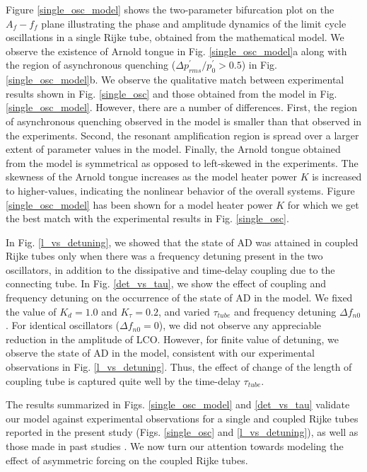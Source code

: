 \documentclass[%
preprint,
 amsmath,amssymb,
 aps,
 pra,
]{revtex4-2}
\begin{document}
Figure \ref{single_osc_model} shows the two-parameter bifurcation plot on the $A_f-f_f$ plane illustrating the phase and amplitude dynamics of the limit cycle oscillations in a single Rijke tube, obtained from the mathematical model. We observe the existence of Arnold tongue in Fig. \ref{single_osc_model}a along with the region of asynchronous quenching ($\Delta p^\prime_{rms}/p^\prime_{0}>0.5$) in Fig. \ref{single_osc_model}b. We observe the qualitative match between experimental results shown in Fig. \ref{single_osc} and those obtained from the model in Fig. \ref{single_osc_model}. However, there are a number of differences. First, the region of asynchronous quenching observed in the model is smaller than that observed in the experiments. Second, the resonant amplification region is spread over a larger extent of parameter values in the model. Finally, the Arnold tongue obtained from the model is symmetrical as opposed to left-skewed in the experiments. The skewness of the Arnold tongue increases as the model heater power $K$ is increased to higher-values, indicating the nonlinear behavior of the overall systems. Figure \ref{single_osc_model} has been shown for a model heater power $K$ for which we get the best match with the experimental results in Fig. \ref{single_osc}.

In Fig. \ref{l_vs_detuning}, we showed that the state of AD was attained in coupled Rijke tubes only when there was a frequency detuning present in the two oscillators, in addition to the dissipative and time-delay coupling due to the connecting tube. In Fig. \ref{det_vs_tau}, we show the effect of coupling and frequency detuning on the occurrence of the state of AD in the model. We fixed the value of $K_d=1.0$ and $K_\tau=0.2$, and varied $\tau_{tube}$ and frequency detuning $\Delta f_{n0}$. For identical oscillators ($\Delta f_{n0}=0$), we did not observe any appreciable reduction in the amplitude of LCO. However, for finite value of detuning, we observe the state of AD in the model, consistent with our experimental observations in Fig. \ref{l_vs_detuning}. Thus, the effect of change of the length of coupling tube is captured quite well by the time-delay $\tau_{tube}$.

The results summarized in Figs. \ref{single_osc_model} and \ref{det_vs_tau} validate our model against experimental observations for a single and coupled Rijke tubes reported in the present study (Figs. \ref{single_osc} and \ref{l_vs_detuning}), as well as those made in past studies \cite{thomas2018effect, hyodo2018stabilization, dange2019oscillation}. We now turn our attention towards modeling the effect of asymmetric forcing on the coupled Rijke tubes. 
\end{document}

